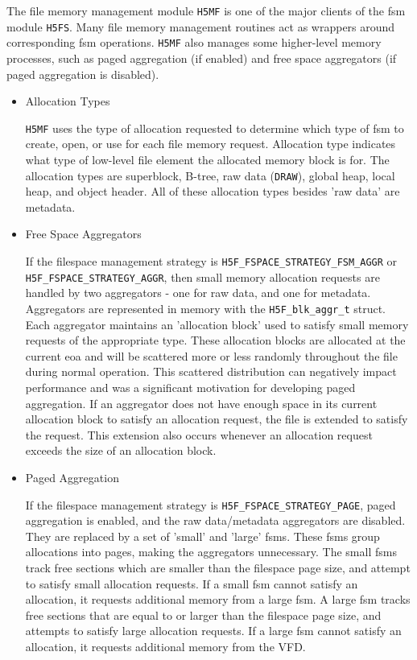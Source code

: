 

The file memory management module \texttt{H5MF} is one of the major clients of the \Gls{fsm} module \texttt{H5FS}. Many file memory management routines act as wrappers around corresponding \Gls{fsm} operations. \texttt{H5MF} also manages some higher-level memory processes, such as paged aggregation (if enabled) and free space aggregators (if paged aggregation is disabled).

\begin{itemize}

    \item Allocation Types

\texttt{H5MF} uses the type of allocation requested to determine which type of \Gls{fsm} to create, open, or use for each file memory request. Allocation type indicates what type of low-level file element the allocated memory block is for. The allocation types are superblock, B-tree, raw data (\texttt{DRAW}), global heap, local heap, and object header. All of these allocation types besides 'raw data' are metadata.

    \item Free Space Aggregators

If the filespace management strategy is \texttt{H5F\_FSPACE\_STRATEGY\_FSM\_AGGR} or \\ \texttt{H5F\_FSPACE\_STRATEGY\_AGGR}, then small memory allocation requests are handled by two aggregators - one for raw data, and one for metadata. Aggregators are represented in memory with the \texttt{H5F\_blk\_aggr\_t} struct. Each aggregator maintains an 'allocation block' used to satisfy small memory requests of the appropriate type. These allocation blocks are allocated at the current \gls{eoa} and will be scattered more or less randomly throughout the file during normal operation. This scattered distribution can negatively impact performance and was a significant motivation for developing paged aggregation. If an aggregator does not have enough space in its current allocation block to satisfy an allocation request, the file is extended to satisfy the request. This extension also occurs whenever an allocation request exceeds the size of an allocation block.

    \item Paged Aggregation

If the filespace management strategy is \texttt{H5F\_FSPACE\_STRATEGY\_PAGE}, paged aggregation is enabled, and the raw data/metadata aggregators are disabled. They are replaced by a set of 'small' and 'large' \Glspl{fsm}. These \Glspl{fsm} group allocations into pages, making the aggregators unnecessary. The small \Glspl{fsm} track free sections which are smaller than the filespace page size, and attempt to satisfy small allocation requests. If a small \Gls{fsm} cannot satisfy an allocation, it requests additional memory from a large \Gls{fsm}. A large \Gls{fsm} tracks free sections that are equal to or larger than the filespace page size, and attempts to satisfy large allocation requests. If a large \Gls{fsm} cannot satisfy an allocation, it requests additional memory from the VFD.


\end{itemize}
